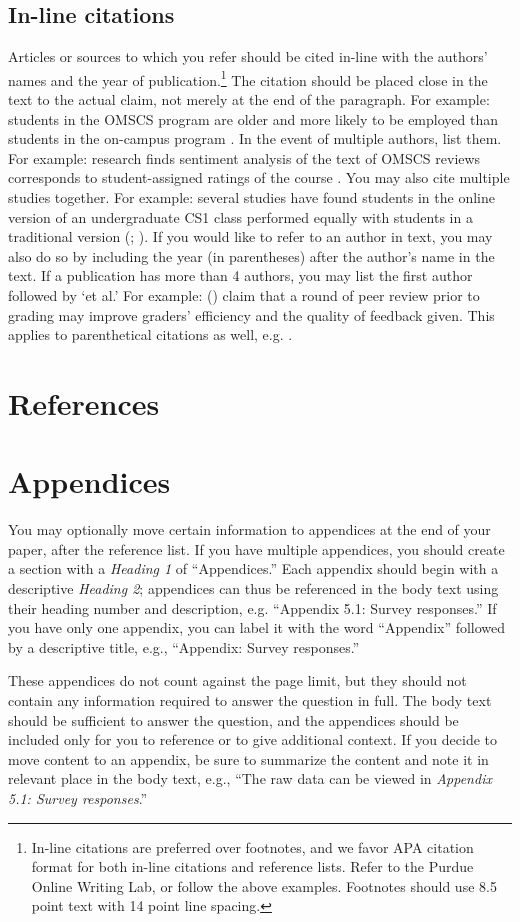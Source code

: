 \documentclass[
	letterpaper, %
]{jdf}
\begin{document}
\subsection{In-line citations}
Articles or sources to which you refer should be cited in-line with the authors’ names and the year of publication.\footnote{In-line citations are preferred over footnotes, and we favor APA citation format for both in-line citations and reference lists. Refer to the Purdue Online Writing Lab, or follow the above examples. Footnotes should use 8.5 point text with 14 point line spacing.} The citation should be placed close in the text to the actual claim, not merely at the end of the paragraph. For example: students in the OMSCS program are older and more likely to be employed than students in the on-campus program \citep{joyner2017}. In the event of multiple authors, list them. For example: research finds sentiment analysis of the text of OMSCS reviews corresponds to student-assigned ratings of the course \citep{newman2018}. You may also cite multiple studies together. For example: several studies have found students in the online version of an undergraduate CS1 class performed equally with students in a traditional version (\cite{joyner2018a}; \cite{joyner2018b}). If you would like to refer to an author in text, you may also do so by including the year (in parentheses) after the author’s name in the text. If a publication has more than 4 authors, you may list the first author followed by ‘et al.’ For example: \citeauthor{joyner2016} (\citeyear{joyner2016}) claim that a round of peer review prior to grading may improve graders’ efficiency and the quality of feedback given. This applies to parenthetical citations as well, e.g. \citep{joyner2016}.

\section{References}
\printbibliography[heading=none]

\section{Appendices}
You may optionally move certain information to appendices at the end of your paper, after the reference list. If you have multiple appendices, you should create a section with a \emph{Heading 1} of “Appendices.” Each appendix should begin with a descriptive \emph{Heading 2}; appendices can thus be referenced in the body text using their heading number and description, e.g. “Appendix 5.1: Survey responses.” If you have only one appendix, you can label it with the word “Appendix” followed by a descriptive title, e.g., “Appendix: Survey responses.”

These appendices do not count against the page limit, but they should not contain any information required to answer the question in full. The body text should be sufficient to answer the question, and the appendices should be included only for you to reference or to give additional context. If you decide to move content to an appendix, be sure to summarize the content and note it in relevant place in the body text, e.g., “The raw data can be viewed in \emph{Appendix 5.1: Survey responses}.”
\end{document}
